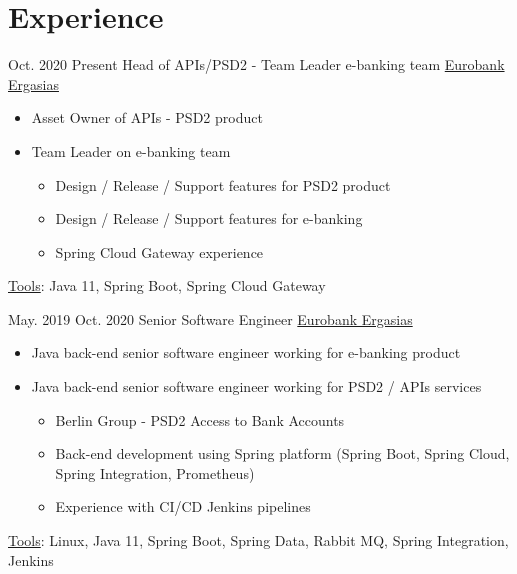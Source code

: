 \documentclass[letterpaper]{style/twentysecondcv} %
\begin{document}
\section{Experience}

\begin{twenty}
	\twentyplusitem
		{Oct. 2020}
		{Present}
		{Head of APIs/PSD2 - Team Leader e-banking team}
		{\href{https://www.eurobank.gr/en/group}{Eurobank Ergasias}}
		{}
		{%
			\begin{itemize}
				\item Asset Owner of APIs - PSD2 product
				\item Team Leader on e-banking team
				\begin{itemize}
					\item Design / Release / Support features for PSD2 product
					\item Design / Release / Support features for e-banking
					\item Spring Cloud Gateway experience
				\end{itemize}
			\end{itemize}
			\vspace{0.5em}
			\underline{Tools}: Java 11, Spring Boot, Spring Cloud Gateway
			\vspace{1.0em}
		}
	\twentyplusitem
		{May. 2019}
		{Oct. 2020}
		{Senior Software Engineer}
		{\href{https://www.eurobank.gr/en/group}{Eurobank Ergasias}}
		{}
		{%
			\begin{itemize}
				\item Java back-end senior software engineer working for e-banking product
				\item Java back-end senior software engineer working for PSD2 / APIs services
				\begin{itemize}
					\item Berlin Group - PSD2 Access to Bank Accounts
					\item Back-end development using Spring platform (Spring Boot, Spring Cloud, Spring Integration, Prometheus)
					\item Experience with CI/CD Jenkins pipelines
				\end{itemize}
			\end{itemize}
			\vspace{0.5em}
			\underline{Tools}: Linux, Java 11, Spring Boot, Spring Data, Rabbit MQ, Spring Integration, Jenkins
}
\end{twenty}
\end{document}
